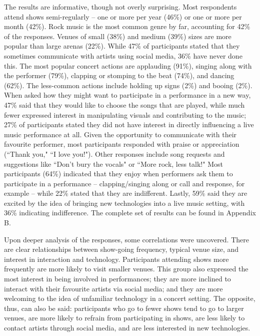 The results are informative, though not overly surprising. Most respondents attend shows semi-regularly -- one or more per year (46\%) or one or more per month (42\%). Rock music is the most common genre by far, accounting for 42\% of the responses. Venues of small (38\%) and medium (39\%) sizes are more popular than large arenas (22\%). While 47\% of participants stated that they sometimes communicate with artists using social media, 36\% have never done this. The most popular concert actions are applauding (91\%), singing along with the performer (79\%), clapping or stomping to the beat (74\%), and dancing (62\%). The less-common actions include holding up signs (2\%) and booing (2\%). When asked how they might want to participate in a performance in a new way, 47\% said that they would like to choose the songs that are played, while much fewer expressed interest in manipulating visuals and contributing to the music; 27\% of participants stated they did not have interest in directly influencing a live music performance at all. Given the opportunity to communicate with their favourite performer, most participants responded with praise or appreciation (``Thank you," ``I love you!"). Other responses include song requests and suggestions like ``Don't bury the vocals" or ``More rock, less talk!" Most participants (64\%) indicated that they enjoy when performers ask them to participate in a performance -- clapping/singing along or call and response, for example -- while 22\% stated that they are indifferent. Lastly, 59\% said they are excited by the idea of bringing new technologies into a live music setting, with 36\% indicating indifference. The complete set of results can be found in Appendix B.

Upon deeper analysis of the responses, some correlations were uncovered. There are clear relationships between show-going frequency, typical venue size, and interest in interaction and technology. Participants attending shows more frequently are more likely to visit smaller venues. This group also expressed the most interest in being involved in performances; they are more inclined to interact with their favourite artists via social media; and they are more welcoming to the idea of unfamiliar technology in a concert setting. The opposite, thus, can also be said: participants who go to fewer shows tend to go to larger venues, are more likely to refrain from participating in shows, are less likely to contact artists through social media, and are less interested in new technologies.

